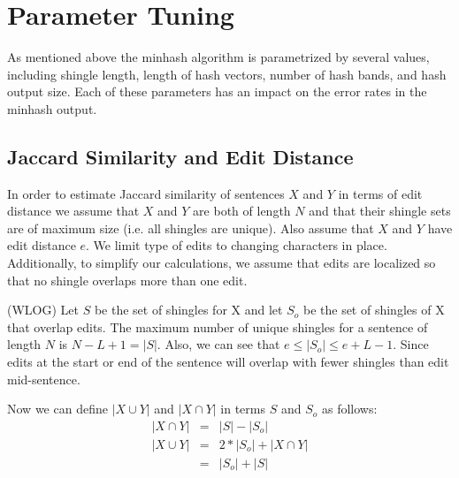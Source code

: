\documentclass{acm_proc_article-sp}
\begin{document}

\section{Parameter Tuning}

As mentioned above the minhash algorithm is parametrized by several values, including shingle length, length of hash vectors, number of hash bands, and hash output size. Each of these parameters has an impact on the error rates in the minhash output. 

\subsection{Jaccard Similarity and Edit Distance}


In order to estimate Jaccard similarity of sentences $X$ and $Y$ in terms of edit distance we assume that $X$ and $Y$ are both of length $N$ and that their shingle sets are of maximum size (i.e. all shingles are unique). Also assume that $X$ and $Y$ have edit distance $e$.  We limit type of edits to changing characters in place. Additionally, to simplify our calculations, we assume that edits are localized so that no shingle overlaps more than one edit.

(WLOG) Let $S$ be the set of shingles for X and let $S_o$ be the set of shingles of X that overlap edits. The maximum number of unique shingles for a sentence of length $N$ is $N - L + 1 = |S|$. Also, we can see that $e \le |S_o| \le e + L - 1$. Since edits at the start or end of the sentence will overlap with fewer shingles than edit mid-sentence.

Now we can define $|X \cup Y|$ and $|X \cap Y|$ in terms $S$ and $S_o$ as follows:
\begin{eqnarray*}
|X \cap Y| & = & |S| - |S_o| \\
|X \cup Y| & = & 2*|S_o| + |X \cap Y| \\
           & = & |S_o| + |S|
\end{eqnarray*}
\end{document}
